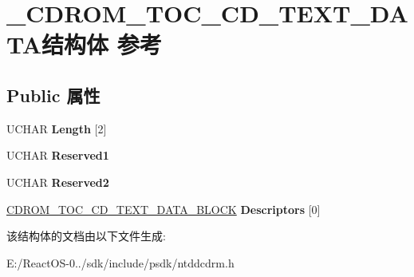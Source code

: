 \hypertarget{struct___c_d_r_o_m___t_o_c___c_d___t_e_x_t___d_a_t_a}{}\section{\+\_\+\+C\+D\+R\+O\+M\+\_\+\+T\+O\+C\+\_\+\+C\+D\+\_\+\+T\+E\+X\+T\+\_\+\+D\+A\+T\+A结构体 参考}
\label{struct___c_d_r_o_m___t_o_c___c_d___t_e_x_t___d_a_t_a}
\subsection*{Public 属性}
\begin{DoxyCompactItemize}
\item 
\mbox{\label{struct___c_d_r_o_m___t_o_c___c_d___t_e_x_t___d_a_t_a_add5f40715af6b7664d0d37596aca5d71}} 
U\+C\+H\+AR {\bfseries Length} \mbox{[}2\mbox{]}
\item 
\mbox{\label{struct___c_d_r_o_m___t_o_c___c_d___t_e_x_t___d_a_t_a_a10a338938d2ba9c0fef0ad9e4845fbeb}} 
U\+C\+H\+AR {\bfseries Reserved1}
\item 
\mbox{\label{struct___c_d_r_o_m___t_o_c___c_d___t_e_x_t___d_a_t_a_a93a686dba9a58d08857e5b74f9af4e3b}} 
U\+C\+H\+AR {\bfseries Reserved2}
\item 
\mbox{\label{struct___c_d_r_o_m___t_o_c___c_d___t_e_x_t___d_a_t_a_acf60971bd6ef8bbc46638de5c91879a7}} 
\hyperlink{struct___c_d_r_o_m___t_o_c___c_d___t_e_x_t___d_a_t_a___b_l_o_c_k}{C\+D\+R\+O\+M\+\_\+\+T\+O\+C\+\_\+\+C\+D\+\_\+\+T\+E\+X\+T\+\_\+\+D\+A\+T\+A\+\_\+\+B\+L\+O\+CK} {\bfseries Descriptors} \mbox{[}0\mbox{]}
\end{DoxyCompactItemize}


该结构体的文档由以下文件生成\+:\begin{DoxyCompactItemize}
\item 
E\+:/\+React\+O\+S-\/0../sdk/include/psdk/ntddcdrm.\+h\end{DoxyCompactItemize}
